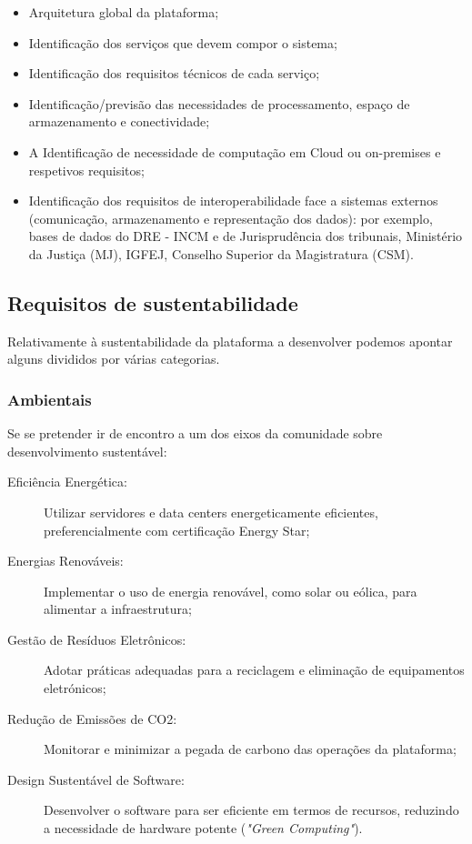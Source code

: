 \begin{itemize}
\item Arquitetura global da plataforma;
\item Identificação dos serviços que devem compor o sistema;
\item Identificação dos requisitos técnicos de cada serviço;
\item Identificação/previsão das necessidades de processamento, espaço de armazenamento e
conectividade;
\item A Identificação de necessidade de computação em Cloud ou on-premises e respetivos
requisitos;
\item Identificação dos requisitos de interoperabilidade face a sistemas externos (comunicação,
armazenamento e representação dos dados): por exemplo, bases de dados do DRE - INCM e
de Jurisprudência dos tribunais, Ministério da Justiça (MJ), IGFEJ, 
Conselho Superior da Magistratura (CSM).
\end{itemize}


\subsection{Requisitos de sustentabilidade}

Relativamente à sustentabilidade da plataforma a desenvolver podemos apontar alguns divididos por várias categorias.

\subsubsection{Ambientais}

Se se pretender ir de encontro a um dos eixos da comunidade sobre desenvolvimento sustentável:

\begin{description}
    \item[Eficiência Energética:] Utilizar servidores e data centers energeticamente eficientes, preferencialmente com 
    certificação Energy Star;
    \item[Energias Renováveis:] Implementar o uso de energia renovável, como solar ou eólica, para alimentar a infraestrutura;
    \item[Gestão de Resíduos Eletrônicos:] Adotar práticas adequadas para a reciclagem e eliminação de equipamentos eletrónicos;
    \item[Redução de Emissões de CO2:] Monitorar e minimizar a pegada de carbono das operações da plataforma;   
    \item[Design Sustentável de Software:] Desenvolver o software para ser eficiente em termos de recursos, reduzindo a 
    necessidade de hardware potente (\emph{"Green Computing"}).
\end{description}

